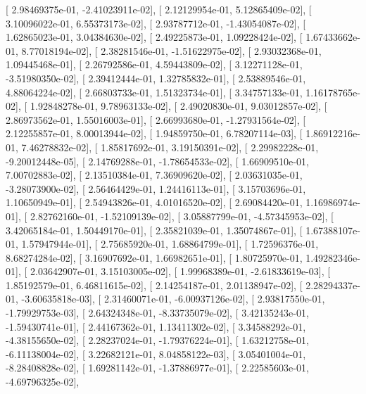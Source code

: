 \documentclass{article}
\begin{document}
       [  2.98469375e-01,  -2.41023911e-02],
       [  2.12129954e-01,   5.12865409e-02],
       [  3.10096022e-01,   6.55373173e-02],
       [  2.93787712e-01,  -1.43054087e-02],
       [  1.62865023e-01,   3.04384630e-02],
       [  2.49225873e-01,   1.09228424e-02],
       [  1.67433662e-01,   8.77018194e-02],
       [  2.38281546e-01,  -1.51622975e-02],
       [  2.93032368e-01,   1.09445468e-01],
       [  2.26792586e-01,   4.59443809e-02],
       [  3.12271128e-01,  -3.51980350e-02],
       [  2.39412444e-01,   1.32785832e-01],
       [  2.53889546e-01,   4.88064224e-02],
       [  2.66803733e-01,   1.51323734e-01],
       [  3.34757133e-01,   1.16178765e-02],
       [  1.92848278e-01,   9.78963133e-02],
       [  2.49020830e-01,   9.03012857e-02],
       [  2.86973562e-01,   1.55016003e-01],
       [  2.66993680e-01,  -1.27931564e-02],
       [  2.12255857e-01,   8.00013944e-02],
       [  1.94859750e-01,   6.78207114e-03],
       [  1.86912216e-01,   7.46278832e-02],
       [  1.85817692e-01,   3.19150391e-02],
       [  2.29982228e-01,  -9.20012448e-05],
       [  2.14769288e-01,  -1.78654533e-02],
       [  1.66909510e-01,   7.00702883e-02],
       [  2.13510384e-01,   7.36909620e-02],
       [  2.03631035e-01,  -3.28073900e-02],
       [  2.56464429e-01,   1.24416113e-01],
       [  3.15703696e-01,   1.10650949e-01],
       [  2.54943826e-01,   4.01016520e-02],
       [  2.69084420e-01,   1.16986974e-01],
       [  2.82762160e-01,  -1.52109139e-02],
       [  3.05887799e-01,  -4.57345953e-02],
       [  3.42065184e-01,   1.50449170e-01],
       [  2.35821039e-01,   1.35074867e-01],
       [  1.67388107e-01,   1.57947944e-01],
       [  2.75685920e-01,   1.68864799e-01],
       [  1.72596376e-01,   8.68274284e-02],
       [  3.16907692e-01,   1.66982651e-01],
       [  1.80725970e-01,   1.49282346e-01],
       [  2.03642907e-01,   3.15103005e-02],
       [  1.99968389e-01,  -2.61833619e-03],
       [  1.85192579e-01,   6.46811615e-02],
       [  2.14254187e-01,   2.01138947e-02],
       [  2.28294337e-01,  -3.60635818e-03],
       [  2.31460071e-01,  -6.00937126e-02],
       [  2.93817550e-01,  -1.79929753e-03],
       [  2.64324348e-01,  -8.33735079e-02],
       [  3.42135243e-01,  -1.59430741e-01],
       [  2.44167362e-01,   1.13411302e-02],
       [  3.34588292e-01,  -4.38155650e-02],
       [  2.28237024e-01,  -1.79376224e-01],
       [  1.63212758e-01,  -6.11138004e-02],
       [  3.22682121e-01,   8.04858122e-03],
       [  3.05401004e-01,  -8.28408828e-02],
       [  1.69281142e-01,  -1.37886977e-01],
       [  2.22585603e-01,  -4.69796325e-02],
\end{document}
